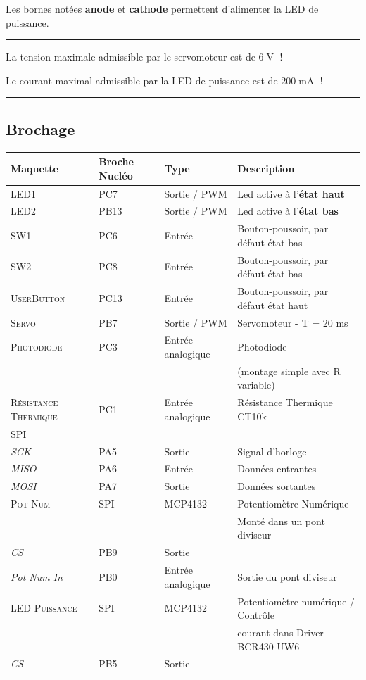 \documentclass[a4paper,11pt,titlepage]{article} %
\begin{document}
Les bornes notées \textbf{anode} et \textbf{cathode} permettent d'alimenter la LED de puissance.

\noindent \rule{\linewidth}{1pt}

{\LARGE La tension maximale admissible par le servomoteur est de $6\operatorname{V}$ !}

{\Large Le courant maximal admissible par la LED de puissance est de $200\operatorname{mA}$ !}

\noindent \rule{\linewidth}{1pt}


\subsection{Brochage}

\begin{center}
\begin{tabular}{|l|l|l|l|}
\hline 
Maquette & \textbf{Broche Nucléo} & Type & Description \\ 
\hline 
\textsc{LED1} & PC7 & Sortie / PWM & Led active à l'\textbf{état haut}\\ 
\textsc{LED2} & PB13 & Sortie / PWM & Led active à l'\textbf{état bas}\\ 
\hline 
\textsc{SW1} & PC6 & Entrée & Bouton-poussoir, par défaut état bas\\ 
\textsc{SW2} & PC8 & Entrée & Bouton-poussoir, par défaut état bas\\ 
\textsc{UserButton} & PC13 & Entrée & Bouton-poussoir, par défaut état haut\\
\hline 
\textsc{Servo} & PB7 & Sortie / PWM & Servomoteur - T = 20 ms\\ 
\hline 
\textsc{Photodiode} & PC3 & Entrée analogique & Photodiode \\
 & & & (montage simple avec R variable)\\ 
\hline 
\textsc{Résistance Thermique} & PC1 & Entrée analogique & Résistance Thermique CT10k\\ 
\hline 
\textsc{SPI} & & & \\ 
\textit{SCK} & PA5 & Sortie & Signal d'horloge\\
\textit{MISO} & PA6 & Entrée & Données entrantes\\
\textit{MOSI} & PA7 & Sortie & Données sortantes\\
\hline 
\textsc{Pot Num} & SPI & MCP4132 & Potentiomètre Numérique\\ 
 & & & Monté dans un pont diviseur\\ 
\textit{CS} & PB9 & Sortie & \\ 
\textit{Pot Num In} & PB0 & Entrée analogique & Sortie du pont diviseur\\ 
\hline 
\textsc{LED Puissance} & SPI & MCP4132 & Potentiomètre numérique / Contrôle\\ 
 & & & courant dans Driver BCR430-UW6\\ 
\textit{CS} & PB5 & Sortie & \\
\hline 
\end{tabular} 
\end{center}
\end{document}
